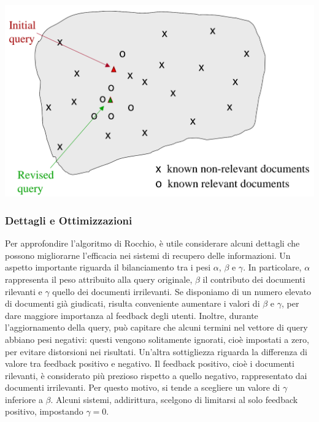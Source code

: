 \documentclass{report}
\begin{document}
	\begin{center}
		\includegraphics[scale=0.25]{assets/rocchio.png}
	\end{center}

	\subsubsection{Dettagli e Ottimizzazioni}
	Per approfondire l'algoritmo di Rocchio, è utile considerare alcuni dettagli che possono migliorarne l'efficacia nei sistemi di recupero delle informazioni. Un aspetto importante riguarda il bilanciamento tra i pesi $\alpha$, $\beta$ e $\gamma$. In particolare, $\alpha$ rappresenta il peso attribuito alla query originale, $\beta$ il contributo dei documenti rilevanti e $\gamma$ quello dei documenti irrilevanti. Se disponiamo di un numero elevato di documenti già giudicati, risulta conveniente aumentare i valori di $\beta$ e $\gamma$, per dare maggiore importanza al feedback degli utenti. Inoltre, durante l'aggiornamento della query, può capitare che alcuni termini nel vettore di query abbiano pesi negativi: questi vengono solitamente ignorati, cioè impostati a zero, per evitare distorsioni nei risultati.
	Un'altra sottigliezza riguarda la differenza di valore tra feedback positivo e negativo. Il feedback positivo, cioè i documenti rilevanti, è considerato più prezioso rispetto a quello negativo, rappresentato dai documenti irrilevanti. Per questo motivo, si tende a scegliere un valore di $\gamma$ inferiore a $\beta$. Alcuni sistemi, addirittura, scelgono di limitarsi al solo feedback positivo, impostando $\gamma = 0$.
\end{document}
